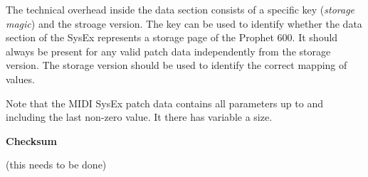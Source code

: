 The technical overhead inside the data section consists of a specific key (\textit{storage magic}) and the stroage version. The key can be used to identify whether the data section of the SysEx represents a storage page of the Prophet 600. It should  always be present for any valid patch data independently from the storage version. The storage version should be used to identify the correct mapping of values.  

Note that the MIDI SysEx patch data contains all parameters up to and including the last non-zero value. It there has variable a size.

\textbf{Checksum}

(this needs to be done)
